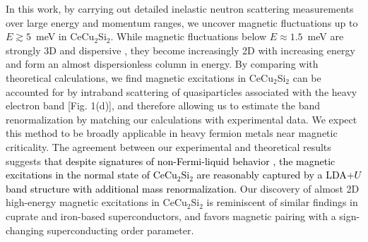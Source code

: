 \documentclass[aps,prl,onecolumn,amsmath,amssymb,superscriptaddress]{revtex4}
\newcommand{\ys}{\textcolor{black}}
\begin{document}
In this work, by carrying out detailed inelastic neutron scattering measurements over large energy and momentum ranges, we uncover magnetic fluctuations up to $E\gtrsim5$~meV in CeCu$_2$Si$_2$. While magnetic fluctuations below $E\approx1.5$~meV are strongly 3D and dispersive \cite{OStockert2011,JArndt2011}, they become increasingly 2D with increasing energy and form an almost dispersionless column in energy.
By comparing with theoretical calculations, we find magnetic excitations in CeCu$_2$Si$_2$ can be accounted for by intraband scattering of quasiparticles associated with the heavy electron band [Fig. 1(d)],
and therefore allowing us to estimate the band renormalization by matching our calculations with experimental data. We expect this method to be broadly applicable in heavy fermion metals near magnetic criticality. 
The agreement between our experimental and theoretical results suggests \ys{that despite signatures of non-Fermi-liquid behavior \cite{PGegenwart1998,JArndt2011}, the magnetic excitations in the normal state of CeCu$_2$Si$_2$ are reasonably captured by a LDA+$U$ band structure with additional mass renormalization.
}
Our discovery of almost 2D high-energy magnetic excitations in CeCu$_2$Si$_2$ is reminiscent of similar findings in cuprate and iron-based superconductors, %
and favors magnetic pairing with a sign-changing superconducting order parameter.
\end{document}
